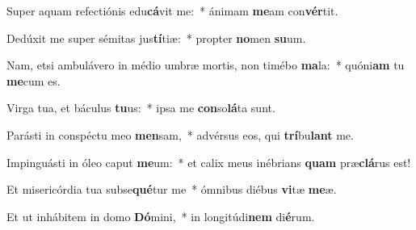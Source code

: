 \item Super aquam refectiónis edu\textbf{cá}vit me:~* ánimam \textbf{me}am con\textbf{vér}tit.
\item Dedúxit me super sémitas jus\textbf{tí}tiæ:~* propter \textbf{no}men \textbf{su}um.
\item Nam, etsi ambulávero in médio umbræ mortis, non timébo \textbf{ma}la:~* quóni\textbf{am} tu \textbf{me}cum es.
\item Virga tua, et báculus \textbf{tu}us:~* ipsa me \textbf{con}so\textbf{lá}ta sunt.
\item Parásti in conspéctu meo \textbf{men}sam,~* advérsus eos, qui \textbf{trí}bu\textbf{lant} me.
\item Impinguásti in óleo caput \textbf{me}um:~* et calix meus inébrians \textbf{quam} præ\textbf{clá}rus est!
\item Et misericórdia tua subse\textbf{qué}tur me~* ómnibus diébus \textbf{vi}tæ \textbf{me}æ.
\item Et ut inhábitem in domo \textbf{Dó}mini,~* in longitúdi\textbf{nem} di\textbf{é}rum.
